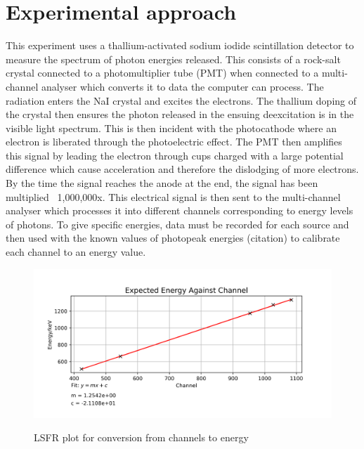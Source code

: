 \documentclass[11pt]{article} %
\newcommand{\citet}{\cite} %
\begin{document}



\section{Experimental approach}
    This experiment uses a thallium-activated sodium iodide scintillation detector to measure the spectrum of photon energies released. This consists of a rock-salt crystal connected to a photomultiplier tube (PMT) when connected to a multi-channel analyser which converts it to data the computer can process. 
    The radiation enters the NaI crystal and excites the electrons. The thallium doping of the crystal then ensures the photon released in the ensuing deexcitation is in the visible light spectrum. This is then incident with the photocathode where an electron is liberated through the photoelectric effect. The PMT then amplifies this signal by leading the electron through cups charged with a large potential difference which cause acceleration and therefore the dislodging of more electrons. By the time the signal reaches the anode at the end, the signal has been multiplied ~1,000,000x.
    This electrical signal is then sent to the multi-channel analyser which processes it into different channels corresponding to energy levels of photons. To give specific energies, data must be recorded for each source and then used with the known values of photopeak energies (citation) to calibrate each channel to an energy value.

    \begin{figure}[H] \centering \label{calibration}
        \includegraphics[scale=0.5]{assets/Calibration.png}
        \caption{LSFR plot for conversion from channels to energy}
    \end{figure}
\end{document}
